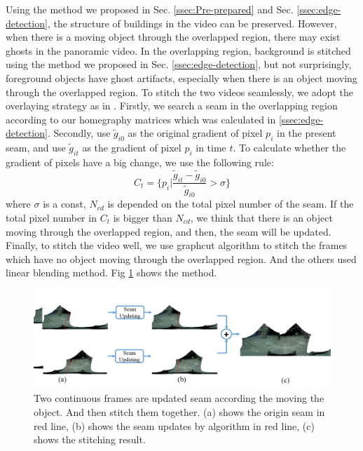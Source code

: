 \documentclass[conference]{IEEEtran}
\begin{document}
Using the method we proposed in Sec. \ref{ssec:Pre-prepared} and Sec. \ref{ssec:edge-detection}, the structure of buildings in the video can be preserved. However, when there is a moving object
through the overlapped region, there may exist ghosts in the panoramic video. 
In the overlapping region, background is stitched using the method we proposed in Sec. \ref{ssec:edge-detection}, but not surprisingly, 
foreground objects have ghost artifacts, especially when there is an object moving through the overlapped region. To stitch the
two videos seamlessly, we adopt the overlaying strategy as in \cite{he2016parallax}. Firstly, we search a seam in the overlapping region according to our homegraphy matrices which was calculated in \ref{ssec:edge-detection}.
Secondly, use $\widetilde{g}_{i0}$ as the original gradient of pixel $p_i$ in the present seam, and use $\widetilde{g}_{it}$ as the gradient of pixel $p_i$ in time $t$. To calculate whether the gradient
of pixels have a big change, we use the following rule:
$$
\textit{C}_{t}=\{p_{i}|\frac{\widetilde{g}_{it}-\widetilde{g}_{i0}}{\widetilde{g}_{i0}}>\sigma\}
$$
where $\sigma$ is a const, $\textit{N}_{cd}$ is depended on the total pixel number of the seam. If the total pixel number in $\textit{C}_t$ is bigger than $\textit{N}_{cd}$, we think that there is an object moving through the overlapped region, and then, the seam will be updated.
Finally, to stitch the video well, we use graphcut algorithm \cite{boykov2004experimental} to stitch the frames which have no object moving through the overlapped region. And the others used linear blending method.
Fig \ref{fig:p24} shows the method.
\begin{figure}[h]
\centering
\includegraphics[scale=0.25]{picture43.png}
\caption{Two continuous frames are updated seam according the moving the object. And then stitch them together. (a) shows the origin seam in red line, (b) shows the seam updates 
by algorithm \cite{he2016parallax} in red line,
(c) shows the stitching result.}
\label{fig:p24}
\end{figure}
\end{document}

